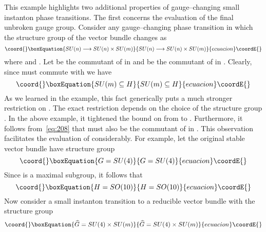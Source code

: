 \documentclass[a4paper,12pt]{article}
\numberwithin{equation}{section}
\theoremstyle{plain}
\begin{document}
This example highlights two additional properties of gauge--changing small
instanton phase transitions. The first concerns the evaluation of the final
unbroken gauge group. Consider any gauge--changing phase transition in which
the structure group of the vector bundle changes as
\begin{equation}\coord{}\boxEquation{
SU(n) \longrightarrow SU(n) \times SU(m)
\label{eq:207}
}{
SU(n) \longrightarrow SU(n) \times SU(m)
}{ecuacion}\coordE{}\end{equation}
where \coordHE{} and \coordHE{}. Let \coordHE{} be the commutant of
\coordHE{} in \coordHE{} and \coordHE{} be the commutant of \coordHE{}
in \coordHE{}.  Clearly, since \coordHE{} must commute with \coordHE{} we have
\begin{equation}\coord{}\boxEquation{
SU(m) \subseteq H 
\label{eq:208}
}{
SU(m) \subseteq H 
}{ecuacion}\coordE{}\end{equation}
As we learned in the example, this fact generically puts a much stronger 
restriction on \coordHE{}. The exact restriction depends on the choice of the
structure group \coordHE{}. In the above example, it tightened the bound on \coordHE{}
from \coordHE{} to  \coordHE{}. Furthermore, it follows
from~\eqref{eq:208} that \coordHE{} must also be the commutant of \coordHE{}
in \coordHE{}. This observation facilitates the evaluation of \coordHE{}
considerably. For example, let the original stable vector bundle have 
structure group
\begin{equation}\coord{}\boxEquation{
G=SU(4)
\label{eq:209}
}{
G=SU(4)
}{ecuacion}\coordE{}\end{equation}
Since \coordHE{} is a maximal subgroup, it follows
that
\begin{equation}\coord{}\boxEquation{
H=SO(10)
\label{eq:210}
}{
H=SO(10)
}{ecuacion}\coordE{}\end{equation}
Now consider a small instanton transition to a reducible vector bundle with
the structure group
\begin{equation}\coord{}\boxEquation{
\widehat{G}=SU(4) \times SU(m)
\label{eq:211}
}{
\widehat{G}=SU(4) \times SU(m)
}{ecuacion}\coordE{}\end{equation}
\end{document}
